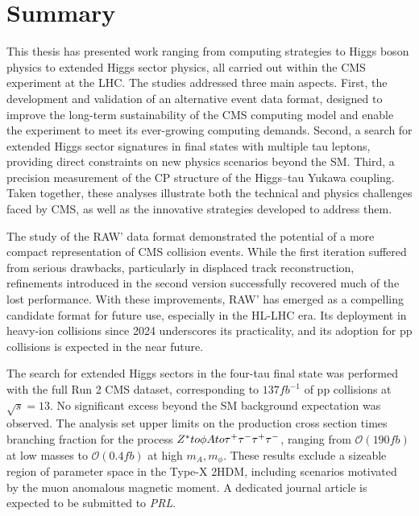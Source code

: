 \chapter{Summary}
\thispagestyle{plain}  %
\pagestyle{chapterpages}
\label{Section:Conclusions}

This thesis has presented work ranging from computing strategies to Higgs boson physics to extended Higgs sector physics, all carried out within the \ac{CMS} experiment at the \ac{LHC}. The studies addressed three main aspects. First, the development and validation of an alternative event data format, designed to improve the long-term sustainability of the CMS computing model and enable the experiment to meet its ever-growing computing demands. Second, a search for extended Higgs sector signatures in final states with multiple tau leptons, providing direct constraints on new physics scenarios beyond the \ac{SM}. Third, a precision measurement of the CP structure of the Higgs–tau Yukawa coupling. Taken together, these analyses illustrate both the technical and physics challenges faced by CMS, as well as the innovative strategies developed to address them.

The study of the RAW' data format demonstrated the potential of a more compact representation of \ac{CMS} collision events. While the first iteration suffered from serious drawbacks, particularly in displaced track reconstruction, refinements introduced in the second version successfully recovered much of the lost performance. With these improvements, RAW' has emerged as a compelling candidate format for future use, especially in the \ac{HL}-\ac{LHC} era. Its deployment in heavy-ion collisions since 2024 underscores its practicality, and its adoption for pp collisions is expected in the near future.

The search for extended Higgs sectors in the four-tau final state was performed with the full Run 2 CMS dataset, corresponding to $137\unit{fb}^{-1}$ of pp collisions at $\sqrt{s} = 13$\TeV. No significant excess beyond the \ac{SM} background expectation was observed. The analysis set upper limits on the production cross section times branching fraction for the process $Z^* to \phi A to \tau^+\tau^-\tau^+\tau^-$, ranging from $\mathcal{O}(190\unit{fb})$ at low masses to $\mathcal{O}(0.4\unit{fb})$ at high $m_A, m_\phi$. These results exclude a sizeable region of parameter space in the Type-X \ac{2HDM}, including scenarios motivated by the muon anomalous magnetic moment. A dedicated journal article is expected to be submitted to \textit{PRL}.

